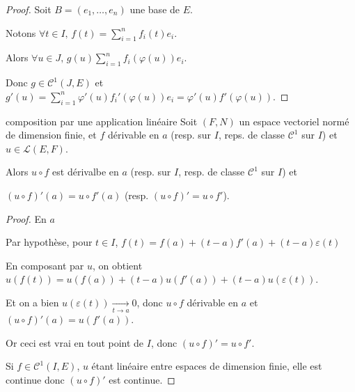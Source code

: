 \documentclass{prepacours}
\begin{document}

\begin{proof}
    Soit $B = (e_1, \ldots, e_n)$ une base de $E$. 

    Notons $\displaystyle \forall t \in I, \, f(t) = \sum_{i=1}^n f_i(t)e_i$. 

    Alors $\displaystyle \forall u \in J, \, g(u ) \sum_{i=1}^n f_i(\varphi(u))e_i$. 

    Donc $g \in \mathscr C^1(J, E)$ et $\displaystyle g'(u) = \sum_{i=1}^n \varphi'(u)f_i'(\varphi(u))e_i = \varphi'(u)f'(\varphi(u))$.
\end{proof}

\begin{theoreme}{composition par une application linéaire}{}
    Soit $(F, N)$ un espace vectoriel normé de dimension finie, et $f$ dérivable en $a$
    (resp. sur $I$, reps. de classe $\mathscr C^1$ sur $I$) et $u \in \mathscr{L }(E, F)$.

    Alors $u \circ f$ est dérivalbe en $a$ (resp. sur $I$, resp. de classe $\mathscr C^1$ sur $I$) et
    
    $(u \circ f)'(a) = u \circ f'(a) $ (resp. $(u \circ f)' = u \circ f'$).

\end{theoreme}


\begin{proof}
    En $a$

    Par hypothèse, pour $t \in I$, $f(t) = f(a) + (t-a)f'(a) + (t-a)\varepsilon(t)$

    En composant par $u$, on obtient $u(f(t)) = u(f(a)) + (t-a)u(f'(a)) + (t-a)u(\varepsilon(t))$.

    Et on a bien $u(\varepsilon(t)) \xrightarrow[t \to a]{} 0$, donc $u \circ f$ dérivable en $a$ et $(u \circ f)'(a) = u(f'(a))$.

    Or ceci est vrai en tout point de $I$, donc $(u \circ f)' = u \circ f'$.

    Si $f \in \mathscr C^1(I, E)$, $u$ étant linéaire entre espaces de dimension finie, elle est continue donc $(u \circ f)'$ 
    est continue. 
\end{proof}
\end{document}
